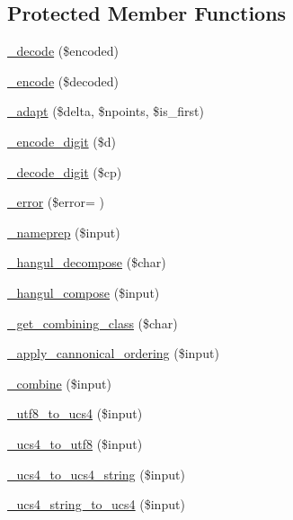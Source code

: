 \subsection*{Protected Member Functions}
\begin{DoxyCompactItemize}
\item 
\hyperlink{classidna__convert_a6e4c2f051cfd4ebd84d47c013c18205e}{\+\_\+decode} (\$encoded)
\item 
\hyperlink{classidna__convert_aa32f14e1635b5bcf8a1000721a53db8d}{\+\_\+encode} (\$decoded)
\item 
\hyperlink{classidna__convert_a521d4543ec6839af3283be4380e91a86}{\+\_\+adapt} (\$delta, \$npoints, \$is\+\_\+first)
\item 
\hyperlink{classidna__convert_afdb30c72ac13c3c71922afb63fabb37c}{\+\_\+encode\+\_\+digit} (\$d)
\item 
\hyperlink{classidna__convert_adb87b0a6d3168899e718dff394723e96}{\+\_\+decode\+\_\+digit} (\$cp)
\item 
\hyperlink{classidna__convert_a16cb93864021e29871b9ad6716ab632c}{\+\_\+error} (\$error= \textquotesingle{}\textquotesingle{})
\item 
\hyperlink{classidna__convert_ac73124acc2f1e772fadd64d176bfe0b9}{\+\_\+nameprep} (\$input)
\item 
\hyperlink{classidna__convert_a9cc5a89053729bb98d2a0ecf143b2b2c}{\+\_\+hangul\+\_\+decompose} (\$char)
\item 
\hyperlink{classidna__convert_a33124ab535f6739a2a5e6fa46c532d28}{\+\_\+hangul\+\_\+compose} (\$input)
\item 
\hyperlink{classidna__convert_abd868ffb75c0d7633998ab14f6621dd3}{\+\_\+get\+\_\+combining\+\_\+class} (\$char)
\item 
\hyperlink{classidna__convert_a3e0f3eceeb2987f2b69b9a3cf6f7181a}{\+\_\+apply\+\_\+cannonical\+\_\+ordering} (\$input)
\item 
\hyperlink{classidna__convert_a751b0b8bfacdc3b79eb77018a508363d}{\+\_\+combine} (\$input)
\item 
\hyperlink{classidna__convert_abafc3eb23a9da5e7b53c5f9f8b7ee035}{\+\_\+utf8\+\_\+to\+\_\+ucs4} (\$input)
\item 
\hyperlink{classidna__convert_a3827709d9c0e35a164838064f73daea5}{\+\_\+ucs4\+\_\+to\+\_\+utf8} (\$input)
\item 
\hyperlink{classidna__convert_ac353a6fccbc4e8e15e90772acb6e2a74}{\+\_\+ucs4\+\_\+to\+\_\+ucs4\+\_\+string} (\$input)
\item 
\hyperlink{classidna__convert_ac95599caba5f1a276ba1a75a12d385dd}{\+\_\+ucs4\+\_\+string\+\_\+to\+\_\+ucs4} (\$input)
\end{DoxyCompactItemize}
